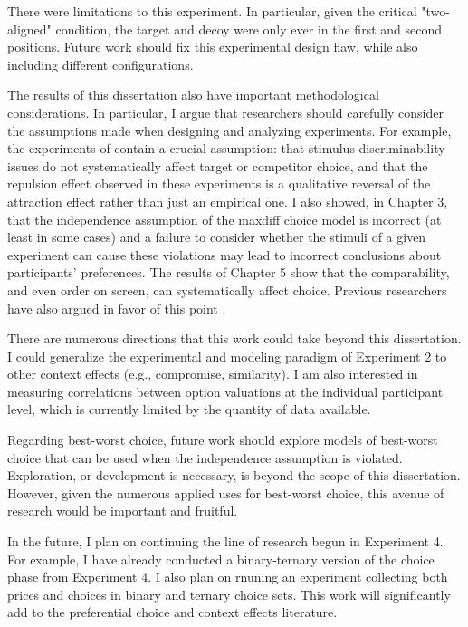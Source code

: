 There were limitations to this experiment. In particular, given the critical "two-aligned" condition, the target and decoy were only ever in the first and second positions. Future work should fix this experimental design flaw, while also including different configurations.

The results of this dissertation also have important methodological considerations. In particular, I argue that researchers should carefully consider the assumptions made when designing and analyzing experiments. For example, the experiments of \textcite{spektorWhenGoodLooks2018b} contain a crucial assumption: that stimulus discriminability issues do not systematically affect target or competitor choice, and that the repulsion effect observed in these experiments is a qualitative reversal of the attraction effect rather than just an empirical one. I also showed, in Chapter 3, that the independence assumption of the maxdiff choice model is incorrect (at least in some cases) and a failure to consider whether the stimuli of a given experiment can cause these violations may lead to incorrect conclusions about participants' preferences. The results of Chapter 5 show that the comparability, and even order on screen, can systematically affect choice. Previous researchers have also argued in favor of this point \parencite{trueblood2022attentional,hasan2025registered,evansImpactPresentationOrder2021}. 

There are numerous directions that this work could take beyond this dissertation. I could generalize the experimental and modeling paradigm of Experiment 2 to other context effects (e.g., compromise, similarity). I am also interested in measuring correlations between option valuations at the individual participant level, which is currently limited by the quantity of data available. 

Regarding best-worst choice, future work should explore models of best-worst choice that can be used when the independence assumption is violated. Exploration, or development is necessary, is beyond the scope of this dissertation. However, given the numerous applied uses for best-worst choice, this avenue of research would be important and fruitful.

In the future, I plan on continuing the line of research begun in Experiment 4. For example, I have already conducted a binary-ternary version of the choice phase from Experiment 4. I also plan on rnuning an experiment collecting both prices and choices in binary and ternary choice sets. This work will significantly add to the preferential choice and context effects literature.

